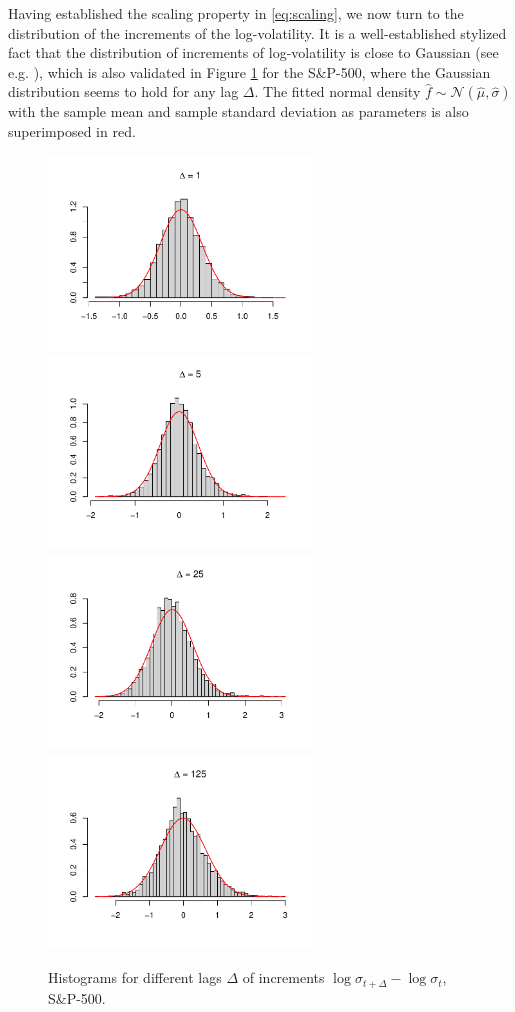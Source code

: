  Having established the scaling property in \eqref{eq:scaling}, we now turn to the distribution of the increments of the log-volatility. It is a well-established stylized fact that the distribution of increments of log-volatility is close to Gaussian (see e.g. \cite{bollerslev}), which is also validated in Figure \ref{fig:histograms} for the S\&P-500, where the Gaussian distribution seems to hold for any lag $\Delta$. The fitted normal density $\hat{f}\sim \mathcal{N}(\hat{\mu}, \hat{\sigma})$ with the sample mean and sample standard deviation as parameters is also superimposed in red.
 \begin{figure}[H]
    \centering
    \includegraphics[scale=0.5, width = 7cm]{fig/img/RealizedLib/histograms/histogram1.pdf}
    \includegraphics[scale=0.5, width = 7cm]{fig/img/RealizedLib/histograms/histogram5.pdf}\hfill
    \includegraphics[scale=0.5, width = 7cm]{fig/img/RealizedLib/histograms/histogram25.pdf}
    \includegraphics[scale=0.5, width = 7cm]{fig/img/RealizedLib/histograms/histogram125.pdf}
    \caption{Histograms for different lags $\Delta$ of increments $\log\sigma_{t+\Delta}-\log\sigma_{t}$, S\&P-500.}
    \label{fig:histograms}
\end{figure}
